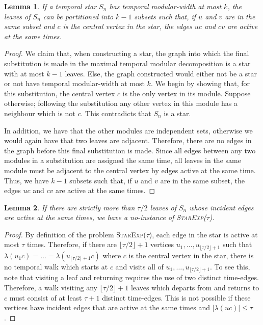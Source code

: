 \documentclass[preprint,12pt]{elsarticle}
\newtheorem{lemma}{Lemma}
\begin{document}
\begin{lemma}\label{lem:star-group-leaves}
    If a temporal star $S_n$ has temporal modular-width at most $k$, the leaves of $S_n$ can be partitioned into $k-1$ subsets such that, if $u$ and $v$  are in the same subset and $c$ is the central vertex in the star, the edges $uc$ and $cv$ are active at the same times.
\end{lemma}
\begin{proof}
    We claim that, when constructing a star, the graph into which the final substitution is made in the maximal temporal modular decomposition is a star with at most $k-1$ leaves. Else, the graph constructed would either not be a star or not have temporal modular-width at most $k$. We begin by showing that, for this substitution, the central vertex $c$ is the only vertex in its module. Suppose otherwise; following the substitution any other vertex in this module has a neighbour which is not $c$. This contradicts that $S_n$ is a star.

    In addition, we have that the other modules are independent sets, otherwise we would again have that two leaves are adjacent. Therefore, there are no edges in the graph before this final substitution is made. Since all edges between any two modules in a substitution are assigned the same time, all leaves in the same module must be adjacent to the central vertex by edges active at the same time. Thus, we have $k-1$ subsets such that, if $u$ and $v$  are in the same subset, the edges $uc$ and $cv$ are active at the same times.
\end{proof}
\begin{lemma}\label{lem:star-no}
    If there are strictly more than $\tau/2$ leaves of $S_n$ whose incident edges are active at the same times, we have a no-instance of \textsc{StarExp($\tau$)}.
\end{lemma}
\begin{proof}
    By definition of the problem \textsc{StarExp($\tau$)}, each edge in the star is active at most $\tau$ times. Therefore, if there are $\lfloor \tau/2 \rfloor + 1$ vertices $u_1, \dots, u_{\lfloor \tau/2 \rfloor + 1}$ such that $\lambda(u_1c)= \dots =\lambda(u_{\lfloor \tau/2 \rfloor + 1}c)$ where $c$ is the central vertex in the star, there is no temporal walk which starts at $c$ and visits all of $u_1, \dots, u_{\lfloor \tau/2 \rfloor + 1}$. To see this, note that visiting a leaf and returning requires the use of two distinct time-edges. Therefore, a walk visiting any $\lfloor \tau/2 \rfloor + 1$ leaves which departs from and returns to $c$ must consist of at least $\tau + 1$ distinct time-edges. This is not possible if these vertices have incident edges that are active at the same times and $|\lambda(uc)|\leq \tau$.
\end{proof}
\end{document}
